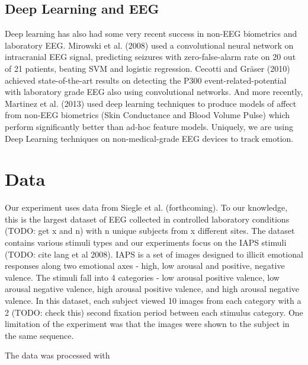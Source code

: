 \documentclass{article} %
\begin{document}
\subsection{Deep Learning and EEG}
Deep learning has also had some very recent success in non-EEG biometrics and laboratory EEG. Mirowski et al. (2008) used a convolutional neural network on intracranial EEG signal, predicting seizures with zero-false-alarm rate on 20 out of 21 patients, beating SVM and logistic regression. Cecotti and Gräser (2010) achieved state-of-the-art results on detecting the P300 event-related-potential with laboratory grade EEG also using convolutional networks. And more recently, Martinez et al.
(2013) used deep learning techniques to produce models of affect from non-EEG biometrics (Skin Conductance and Blood Volume Pulse) which perform significantly better than ad-hoc feature models.
Uniquely, we are using Deep Learning techniques on non-medical-grade EEG devices to track emotion.

\section{Data} \label{section:data}
Our experiment uses data from Siegle et al. (forthcoming). To our knowledge, this is the largest dataset of EEG collected in controlled laboratory conditions (TODO: get x and n) with n unique subjects from x different sites. The dataset contains various stimuli types and our experiments focus on the IAPS stimuli (TODO: cite lang et al 2008). IAPS is a set of images designed to illicit emotional responses along two emotional axes - high, low arousal and positive, negative valence. The stimuli
fall into 4 categories - low arousal positive valence, low arousal negative valence, high arousal positive valence, and high arousal negative valence. In this dataset, each subject viewed 10 images from each category with a 2 (TODO: check this) second fixation period between each stimulus category. One limitation of the experiment was that the images were shown to the subject in the same sequence.

The data was processed with %
\end{document}
